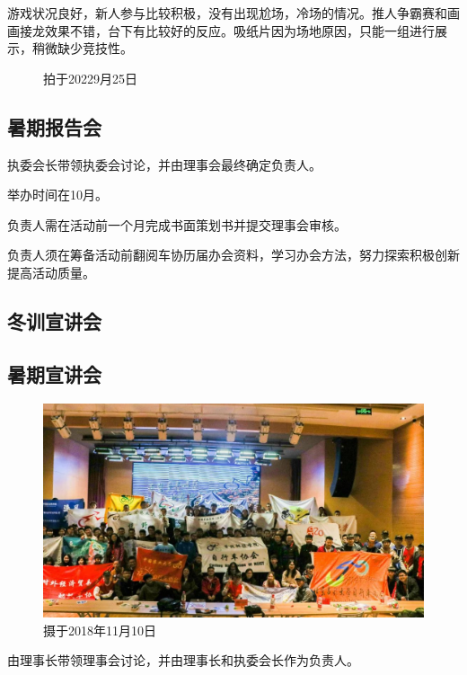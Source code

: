 \documentclass{ctexbook}
\begin{document}
游戏状况良好，新人参与比较积极，没有出现尬场，冷场的情况。推人争霸赛和画画接龙效果不错，台下有比较好的反应。吸纸片因为场地原因，只能一组进行展示，稍微缺少竞技性。





\begin{figure}[!htb]
    \centering
       \quad 
        \caption{拍于20229月25日}
  \end{figure}


\subsection{暑期报告会}

执委会长带领执委会讨论，并由理事会最终确定负责人。

    举办时间在10月。

    负责人需在活动前一个月完成书面策划书并提交理事会审核。

    负责人须在筹备活动前翻阅车协历届办会资料，学习办会方法，努力探索积极创新提高活动质量。

\subsection{冬训宣讲会}


\subsection{暑期宣讲会}
\begin{figure}[H]
    \centering
    \includegraphics[width=0.7\linewidth]{fig/暑期报告会.jpg}
    \caption{摄于2018年11月10日}
    \label{fig:}
\end{figure}
   由理事长带领理事会讨论，并由理事长和执委会长作为负责人。
\end{document}
